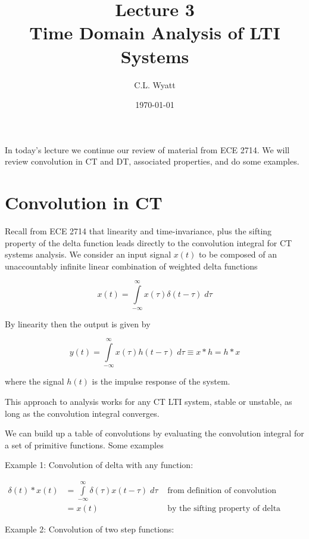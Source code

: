\documentclass{article}
\begin{document}
\title{Lecture 3\\ Time Domain Analysis of LTI Systems}
\author{C.L. Wyatt}
\date{\today}
\maketitle

In today's lecture we continue our review of material from ECE 2714. We will review convolution in CT and DT, associated properties, and do some examples.

\section{Convolution in CT}

Recall from ECE 2714 that linearity and time-invariance, plus the sifting property of the delta function leads directly to the convolution integral for CT systems analysis. We consider an input signal $x(t)$ to be composed of an unaccountably infinite linear combination of weighted delta functions 

\begin{equation}
  x(t) = \int\limits_{-\infty}^{\infty} x(\tau)\delta(t-\tau)\; d\tau
\end{equation}

By linearity then the output is given by

\begin{equation}
  y(t) = \int\limits_{-\infty}^{\infty} x(\tau)h(t-\tau)\; d\tau \equiv x * h = h * x
\end{equation}

where the signal $h(t)$ is the impulse response of the system.

This approach to analysis works for any CT LTI system, stable or unstable, as long as the convolution integral converges.

We can build up a table of convolutions by evaluating the convolution integral for a set of primitive functions. Some examples

Example 1: Convolution of delta with any function:

\begin{align}
  \delta(t) * x(t) &= \int\limits_{-\infty}^{\infty} \delta(\tau)x(t-\tau)\; d\tau & \text{ from definition of convolution}\\
  &= x(t) & \text{ by the sifting property of delta function}
\end{align}

Example 2: Convolution of two step functions:
\end{document}
